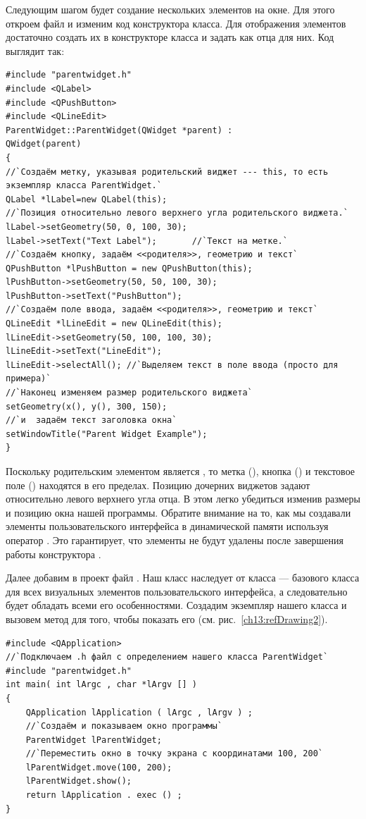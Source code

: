Следующим шагом будет создание нескольких элементов на окне. Для этого откроем файл  и изменим
код конструктора класса. Для отображения элементов достаточно создать их в конструкторе класса и задать
 как отца для них. Код  выглядит так:
\begin{lstlisting}
#include "parentwidget.h"
#include <QLabel>
#include <QPushButton>
#include <QLineEdit>
ParentWidget::ParentWidget(QWidget *parent) :
QWidget(parent)
{
//`Создаём метку, указывая родительский виджет --- this, то есть экземпляр класса ParentWidget.`
QLabel *lLabel=new QLabel(this);
//`Позиция относительно левого верхнего угла родительского виджета.`
lLabel->setGeometry(50, 0, 100, 30);
lLabel->setText("Text Label");       //`Текст на метке.`
//`Создаём кнопку, задаём <<родителя>>, геометрию и текст`
QPushButton *lPushButton = new QPushButton(this);
lPushButton->setGeometry(50, 50, 100, 30);
lPushButton->setText("PushButton");
//`Создаём поле ввода, задаём <<родителя>>, геометрию и текст`
QLineEdit *lLineEdit = new QLineEdit(this);
lLineEdit->setGeometry(50, 100, 100, 30);
lLineEdit->setText("LineEdit");
lLineEdit->selectAll(); //`Выделяем текст в поле ввода (просто для примера)`
//`Наконец изменяем размер родительского виджета`
setGeometry(x(), y(), 300, 150);
//`и  задаём текст заголовка окна`
setWindowTitle("Parent Widget Example");
}
\end{lstlisting}

Поскольку родительским элементом является , то метка (), 
кнопка () и текстовое
поле () находятся в его пределах. Позицию дочерних виджетов 
задают относительно левого верхнего угла отца. В
этом легко убедиться изменив размеры и позицию окна нашей программы. Обратите внимание 
на то, как мы создавали элементы
пользовательского интерфейса в динамической памяти используя оператор . Это гарантирует, что элементы не
будут удалены после завершения работы конструктора .

Далее добавим в проект файл . Наш класс наследует от 
класса  --- базового класса для всех
визуальных элементов пользовательского интерфейса, а следовательно будет 
обладать всеми его особенностями. Создадим
экземпляр нашего класса и вызовем метод  для того, чтобы показать 
его (см. рис.~\ref{ch13:refDrawing2}).

\begin{lstlisting}	 
#include <QApplication> 
//`Подключаем .h файл с определением нашего класса ParentWidget` 
#include "parentwidget.h" 
int main( int lArgc , char *lArgv [] ) 
{ 
    QApplication lApplication ( lArgc , lArgv ) ; 
    //`Создаём и показываем окно программы` 
    ParentWidget lParentWidget; 
    //`Переместить окно в точку экрана с координатами 100, 200` 
    lParentWidget.move(100, 200); 
    lParentWidget.show(); 
    return lApplication . exec () ; 
}
\end{lstlisting}


